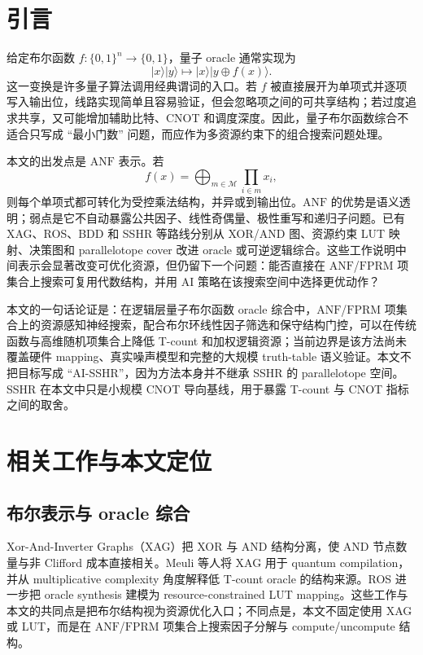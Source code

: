 \documentclass[UTF8,fontset=macnew,11pt]{ctexart}
\newcommand{\anf}{\ensuremath{\mathrm{ANF}}}
\newcommand{\fprm}{\ensuremath{\mathrm{FPRM}}}
\newcommand{\xor}{\ensuremath{\oplus}}
\newcommand{\ttable}{truth-table}
\begin{document}
\section{引言}

给定布尔函数 $f:\{0,1\}^n\rightarrow\{0,1\}$，量子 oracle 通常实现为
\begin{equation}
  |x\rangle |y\rangle \mapsto |x\rangle |y\xor f(x)\rangle .
  \label{eq:oracle}
\end{equation}
这一变换是许多量子算法调用经典谓词的入口。若 $f$ 被直接展开为单项式并逐项写入输出位，线路实现简单且容易验证，但会忽略项之间的可共享结构；若过度追求共享，又可能增加辅助比特、CNOT 和调度深度。因此，量子布尔函数综合不适合只写成 ``最小门数'' 问题，而应作为多资源约束下的组合搜索问题处理。

本文的出发点是 \anf{} 表示。若
\begin{equation}
  f(x)=\bigoplus_{m\in\mathcal{M}}\prod_{i\in m}x_i ,
  \label{eq:anf}
\end{equation}
则每个单项式都可转化为受控乘法结构，并异或到输出位。\anf{} 的优势是语义透明；弱点是它不自动暴露公共因子、线性奇偶量、极性重写和递归子问题。已有 XAG、ROS、BDD 和 SSHR 等路线分别从 XOR/AND 图、资源约束 LUT 映射、决策图和 parallelotope cover 改进 oracle 或可逆逻辑综合\cite{meuli2022xag,meuli2020ros,wille2009bdd,zheng2025sshr}。这些工作说明中间表示会显著改变可优化资源，但仍留下一个问题：能否直接在 \anf{}/\fprm{} 项集合上搜索可复用代数结构，并用 AI 策略在该搜索空间中选择更优动作？

本文的一句话论证是：在逻辑层量子布尔函数 oracle 综合中，\anf{}/\fprm{} 项集合上的资源感知神经搜索，配合布尔环线性因子筛选和保守结构门控，可以在传统函数与高维随机项集合上降低 T-count 和加权逻辑资源；当前边界是该方法尚未覆盖硬件 mapping、真实噪声模型和完整的大规模 \ttable{} 语义验证。本文不把目标写成 ``AI-SSHR''，因为方法本身并不继承 SSHR 的 parallelotope 空间。SSHR 在本文中只是小规模 CNOT 导向基线，用于暴露 T-count 与 CNOT 指标之间的取舍。

\section{相关工作与本文定位}

\subsection{布尔表示与 oracle 综合}

Xor-And-Inverter Graphs（XAG）把 XOR 与 AND 结构分离，使 AND 节点数量与非 Clifford 成本直接相关。Meuli 等人将 XAG 用于 quantum compilation\cite{meuli2022xag}，并从 multiplicative complexity 角度解释低 T-count oracle 的结构来源\cite{meuli2019multiplicative}。ROS 进一步把 oracle synthesis 建模为 resource-constrained LUT mapping\cite{meuli2020ros}。这些工作与本文的共同点是把布尔结构视为资源优化入口；不同点是，本文不固定使用 XAG 或 LUT，而是在 \anf{}/\fprm{} 项集合上搜索因子分解与 compute/uncompute 结构。
\end{document}
